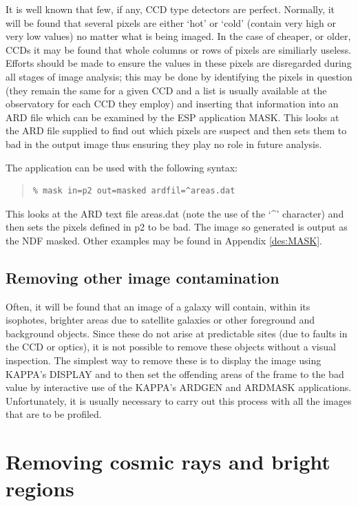 \documentclass[twoside,11pt]{article}
\newcommand{\xref}[3]{#1}
\newenvironment{myquote}{\begin{quote}\begin{small}}{\end{small}\end{quote}}
\begin{document}
It is well known that few, if any, CCD type detectors are perfect. Normally,
it will be found that several pixels are either `hot' or `cold' (contain very 
high or very low values) no matter what is being imaged. In the case of 
cheaper, or older, CCDs it may be found that whole columns or rows of pixels 
are similiarly useless. Efforts should be made to ensure the values in these
pixels are disregarded during all stages of image analysis; this may
be done by identifying the pixels in question (they remain the same for 
a given CCD and a list is usually available at the observatory for
each CCD they employ) and inserting that information into an ARD file
which can be examined by the ESP application MASK. This looks at the 
ARD file supplied to find out which pixels are suspect and then sets them
to bad in the output image thus ensuring they play no role in future analysis.

The application can be used with the following syntax:

\begin{myquote}
\begin{verbatim}
% mask in=p2 out=masked ardfil=^areas.dat
\end{verbatim}
\end{myquote}

This looks at the ARD text file areas.dat (note the use of the 
`\^{ }' character) and then sets the pixels defined 
in p2 to be bad. The image so generated is output as the NDF masked.
Other examples may be found in Appendix \ref{des:MASK}.


\subsection{Removing other image contamination}

Often, it will be found that an image of a galaxy will contain, within its 
isophotes, brighter areas due to satellite galaxies or other foreground and 
background objects. Since these do not arise at predictable sites (due to faults
in the CCD or optics), it is not possible to remove 
these objects without a visual inspection. The simplest way to remove these 
is to display the image using \xref{KAPPA}{sun95}{}'s DISPLAY and to then set the offending 
areas of the frame to the bad value 
by interactive use of the \xref{KAPPA}{sun95}{}'s ARDGEN and ARDMASK applications. 
Unfortunately, it is usually necessary to carry out this process with all the 
images that are to be profiled. 

\section{Removing cosmic rays and bright regions}
\label{sec:removc}
\end{document}
